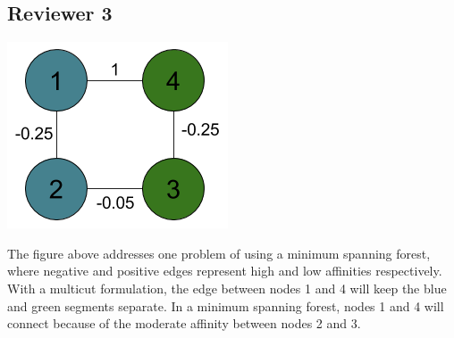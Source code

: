 \documentclass[10pt,twocolumn,letterpaper]{article}
\begin{document}
\subsection*{Reviewer 3}


\begin{center}
	\includegraphics[width=0.28\linewidth]{./figures/MSF.png}
\end{center}


The figure above addresses one problem of using a minimum spanning forest, where negative and positive edges represent high and low affinities respectively. With a multicut formulation, the edge between nodes 1 and 4 will keep the blue and green segments separate. In a minimum spanning forest, nodes 1 and 4 will connect because of the moderate affinity between nodes 2 and 3.

{\small


}
\end{document}
